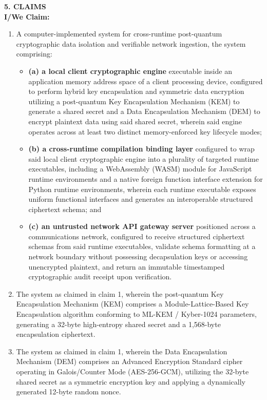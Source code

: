 \documentclass[12pt, a4paper]{article}
\begin{document}
\newpage
\noindent \textbf{5. CLAIMS} \\
\textbf{I/We Claim:}

\begin{enumerate}
    \item A computer-implemented system for cross-runtime post-quantum cryptographic data isolation and verifiable network ingestion, the system comprising:
    \begin{itemize}
        \item \textbf{(a) a local client cryptographic engine} executable inside an application memory address space of a client processing device, configured to perform hybrid key encapsulation and symmetric data encryption utilizing a post-quantum Key Encapsulation Mechanism (KEM) to generate a shared secret and a Data Encapsulation Mechanism (DEM) to encrypt plaintext data using said shared secret, wherein said engine operates across at least two distinct memory-enforced key lifecycle modes;
        \item \textbf{(b) a cross-runtime compilation binding layer} configured to wrap said local client cryptographic engine into a plurality of targeted runtime executables, including a WebAssembly (WASM) module for JavaScript runtime environments and a native foreign function interface extension for Python runtime environments, wherein each runtime executable exposes uniform functional interfaces and generates an interoperable structured ciphertext schema; and
        \item \textbf{(c) an untrusted network API gateway server} positioned across a communications network, configured to receive structured ciphertext schemas from said runtime executables, validate schema formatting at a network boundary without possessing decapsulation keys or accessing unencrypted plaintext, and return an immutable timestamped cryptographic audit receipt upon verification.
    \end{itemize}
    
    \item The system as claimed in claim 1, wherein the post-quantum Key Encapsulation Mechanism (KEM) comprises a Module-Lattice-Based Key Encapsulation algorithm conforming to ML-KEM / Kyber-1024 parameters, generating a 32-byte high-entropy shared secret and a 1,568-byte encapsulation ciphertext.
    
    \item The system as claimed in claim 1, wherein the Data Encapsulation Mechanism (DEM) comprises an Advanced Encryption Standard cipher operating in Galois/Counter Mode (AES-256-GCM), utilizing the 32-byte shared secret as a symmetric encryption key and applying a dynamically generated 12-byte random nonce.
    

\end{enumerate}
\end{document}
